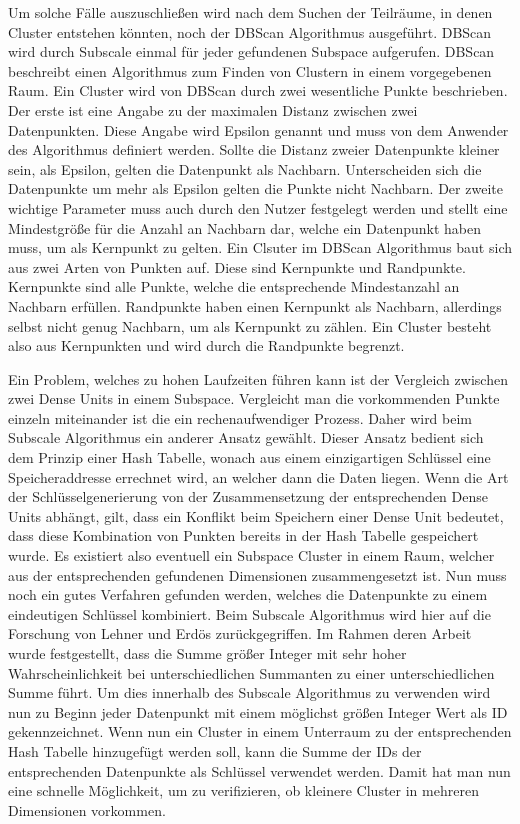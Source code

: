 \documentclass[utf8,biblatex]{lni}
\begin{document}
Um solche Fälle auszuschließen wird nach dem Suchen der Teilräume, in denen Cluster entstehen könnten, noch der DBScan Algorithmus ausgeführt. 
DBScan wird durch Subscale einmal für jeder gefundenen Subspace aufgerufen. 
DBScan beschreibt einen Algorithmus zum Finden von Clustern in einem vorgegebenen Raum. 
Ein Cluster wird von DBScan durch zwei wesentliche Punkte beschrieben. 
Der erste ist eine Angabe zu der maximalen Distanz zwischen zwei Datenpunkten. 
Diese Angabe wird Epsilon genannt und muss von dem Anwender des Algorithmus definiert werden. 
Sollte die Distanz zweier Datenpunkte kleiner sein, als Epsilon, gelten die Datenpunkt als Nachbarn. 
Unterscheiden sich die Datenpunkte um mehr als Epsilon gelten die Punkte nicht Nachbarn. 
Der zweite wichtige Parameter muss auch durch den Nutzer festgelegt werden und stellt eine Mindestgröße für die Anzahl an Nachbarn dar, welche ein Datenpunkt haben muss, um als Kernpunkt zu gelten. 
Ein Clsuter im DBScan Algorithmus baut sich aus zwei Arten von Punkten auf. 
Diese sind Kernpunkte und Randpunkte. 
Kernpunkte sind alle Punkte, welche die entsprechende Mindestanzahl an Nachbarn erfüllen. 
Randpunkte haben einen Kernpunkt als Nachbarn, allerdings selbst nicht genug Nachbarn, um als Kernpunkt zu zählen. 
Ein Cluster besteht also aus Kernpunkten und wird durch die Randpunkte begrenzt. 


Ein Problem, welches zu hohen Laufzeiten führen kann ist der Vergleich zwischen zwei Dense Units in einem Subspace. 
Vergleicht man die vorkommenden Punkte einzeln miteinander ist die ein rechenaufwendiger Prozess. 
Daher wird beim Subscale Algorithmus ein anderer Ansatz gewählt. 
Dieser Ansatz bedient sich dem Prinzip einer Hash Tabelle, wonach aus einem einzigartigen Schlüssel eine Speicheraddresse errechnet wird, an welcher dann die Daten liegen. 
Wenn die Art der Schlüsselgenerierung von der Zusammensetzung der entsprechenden Dense Units abhängt, gilt, dass ein Konflikt beim Speichern einer Dense Unit bedeutet, dass diese Kombination von Punkten bereits in der Hash Tabelle gespeichert wurde. 
Es existiert also eventuell ein Subspace Cluster in einem Raum, welcher aus der entsprechenden gefundenen Dimensionen zusammengesetzt ist. 
Nun muss noch ein gutes Verfahren gefunden werden, welches die Datenpunkte zu einem eindeutigen Schlüssel kombiniert. 
Beim Subscale Algorithmus wird hier auf die Forschung von Lehner und Erdös zurückgegriffen. 
Im Rahmen deren Arbeit wurde festgestellt, dass die Summe größer Integer mit sehr hoher Wahrscheinlichkeit bei unterschiedlichen Summanten zu einer unterschiedlichen Summe führt. 
Um dies innerhalb des Subscale Algorithmus zu verwenden wird nun zu Beginn jeder Datenpunkt mit einem möglichst größen Integer Wert als ID gekennzeichnet. 
Wenn nun ein Cluster in einem Unterraum zu der entsprechenden Hash Tabelle hinzugefügt werden soll, kann die Summe der IDs der entsprechenden Datenpunkte als Schlüssel verwendet werden. 
Damit hat man nun eine schnelle Möglichkeit, um zu verifizieren, ob kleinere Cluster in mehreren Dimensionen vorkommen. 
\end{document}
